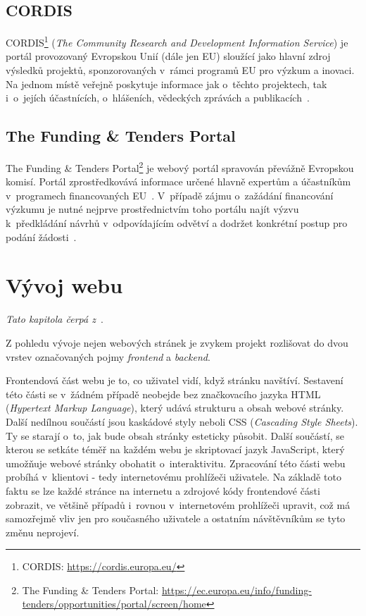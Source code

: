 \blindtext[2]

\subsection{CORDIS}
CORDIS\footnote{CORDIS: \url{https://cordis.europa.eu/}} (\emph{The Community Research and Development Information Service}) je portál provozovaný Evropskou Unií (dále jen EU) sloužící jako hlavní zdroj výsledků projektů, sponzorovaných v~rámci programů EU pro výzkum a inovaci. Na jednom místě veřejně poskytuje informace jak o~těchto projektech, tak i~o~jejích účastnících, o~hlášeních, vědeckých zprávách a publikacích~\cite{bib:cordis}.

\subsection{The Funding \& Tenders Portal}

The Funding \& Tenders Portal\footnote{The Funding \& Tenders Portal: \url{https://ec.europa.eu/info/funding-tenders/opportunities/portal/screen/home}} je webový portál spravován převážně Evropskou komisí. Portál zprostředkovává informace určené hlavně expertům a účastníkům v~programech financovaných EU~\cite{bib:funding-about}.
V~případě zájmu o~zažádání financování výzkumu je nutné nejprve prostřednictvím toho portálu najít výzvu k~předkládání návrhů v~odpovídajícím odvětví a dodržet konkrétní postup pro podání žádosti~\cite{bib:funding-find}.



\section{Vývoj webu}
\emph{Tato kapitola čerpá z~\cite{bib:web-development}}.

Z pohledu vývoje nejen webových stránek je zvykem projekt rozlišovat do dvou vrstev označovaných pojmy \emph{frontend} a \emph{backend}.

Frontendová část webu je to, co uživatel vidí, když stránku navštíví. Sestavení této části se v~žádném případě neobejde bez značkovacího jazyka HTML (\emph{Hypertext Markup Language}), který udává strukturu a obsah webové stránky. Další nedílnou součástí jsou kaskádové styly neboli CSS (\emph{Cascading Style Sheets}). Ty se starají o~to, jak bude obsah stránky esteticky působit. Další součástí, se kterou se setkáte téměř na každém webu je skriptovací jazyk JavaScript, který umožňuje webové stránky obohatit o~interaktivitu.
Zpracování této části webu probíhá v~klientovi - tedy internetovému prohlížeči uživatele. Na základě toto faktu se lze každé stránce na internetu  a zdrojové kódy frontendové části zobrazit, ve většině případů i~rovnou v~internetovém prohlížeči upravit, což má samozřejmě vliv jen pro současného uživatele a ostatním návštěvníkům se tyto změnu neprojeví.

